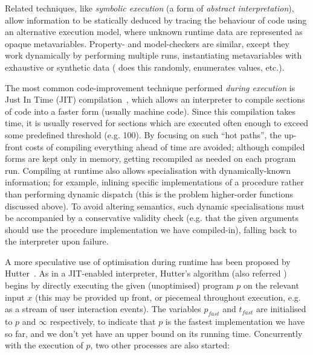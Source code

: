 Related techniques, like \emph{symbolic execution} (a form of \emph{abstract
  interpretation}), allow information to be statically deduced by tracing the
behaviour of code using an alternative execution model, where unknown runtime
data are represented as opaque metavariables. Property- and model-checkers are
similar, except they work dynamically by performing multiple runs, instantiating
metavariables with exhaustive or synthetic data (\quickcheck{} does this
randomly, \smallcheck{} enumerates values, etc.).

The most common code-improvement technique performed \emph{during execution} is
Just In Time (JIT) compilation~\iffalse TODO: Cite \fi, which allows an
interpreter to compile sections of code into a faster form (usually machine
code). Since this compilation takes time, it is usually reserved for sections
which are executed often enough to exceed some predefined threshold (e.g. 100).
By focusing on such ``hot paths'', the up-front costs of compiling everything
ahead of time are avoided; although compiled forms are kept only in memory,
getting recompiled as needed on each program run. Compiling at runtime also
allows specialisation with dynamically-known information; for example, inlining
specific implementations of a procedure rather than performing dynamic dispatch
(this is the problem higher-order functions discussed above). To avoid altering
semantics, such dynamic specialisations must be accompanied by a conservative
validity check (e.g. that the given arguments should use the procedure
implementation we have compiled-in), falling back to the interpreter upon
failure.

A more speculative use of optimisation during runtime has been proposed by
Hutter~\iffalse TODO: Cite \fi. As in a JIT-enabled interpreter, Hutter's
algorithm (also referred \hsearch{}) begins by directly executing the given
(unoptimised) program $p$ on the relevant input $x$ (this may be provided up
front, or piecemeal throughout execution, e.g. as a stream of user interaction
events). The variables $p_{fast}$ and $t_{fast}$ are initialised to $p$ and
$\infty$ respectively, to indicate that $p$ is the fastest implementation we
have so far, and we don't yet have an upper bound on its running
time. Concurrently with the execution of $p$, two other processes are also
started:

